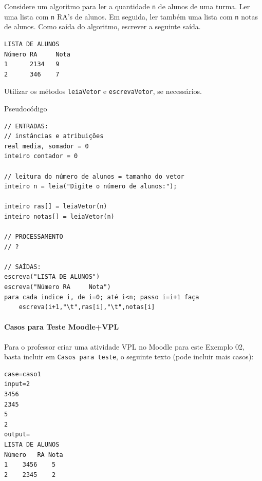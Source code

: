 \documentclass[12pt,a4paper]{article}
\begin{document}
Considere um algoritmo para ler a quantidade \texttt{n} de alunos de uma
turma. Ler uma lista com \texttt{n} RA's de alunos. Em seguida, ler
também uma lista com \texttt{n} notas de alunos. Como saída do
algoritmo, escrever a seguinte saída.

\begin{verbatim}
LISTA DE ALUNOS
Número RA     Nota
1      2134   9
2      346    7
\end{verbatim}

Utilizar os métodos \texttt{leiaVetor} e \texttt{escrevaVetor}, se
necessários.

    Pseudocódigo

\begin{verbatim}
// ENTRADAS:
// instâncias e atribuições
real media, somador = 0
inteiro contador = 0

// leitura do número de alunos = tamanho do vetor
inteiro n = leia("Digite o número de alunos:");

inteiro ras[] = leiaVetor(n)
inteiro notas[] = leiaVetor(n)
 
// PROCESSAMENTO
// ?

// SAÍDAS:
escreva("LISTA DE ALUNOS")
escreva("Número RA     Nota")
para cada indice i, de i=0; até i<n; passo i=i+1 faça 
    escreva(i+1,"\t",ras[i],"\t",notas[i]
\end{verbatim}

    \hypertarget{casos-para-teste-moodlevpl}{%
\paragraph{Casos para Teste
Moodle+VPL}\label{casos-para-teste-moodlevpl}}

Para o professor criar uma atividade VPL no Moodle para este Exemplo 02,
basta incluir em \texttt{Casos\ para\ teste}, o seguinte texto (pode
incluir mais casos):

\begin{verbatim}
case=caso1
input=2
3456
2345
5
2
output= 
LISTA DE ALUNOS
Número   RA Nota
1    3456    5
2    2345    2
\end{verbatim}
\end{document}
